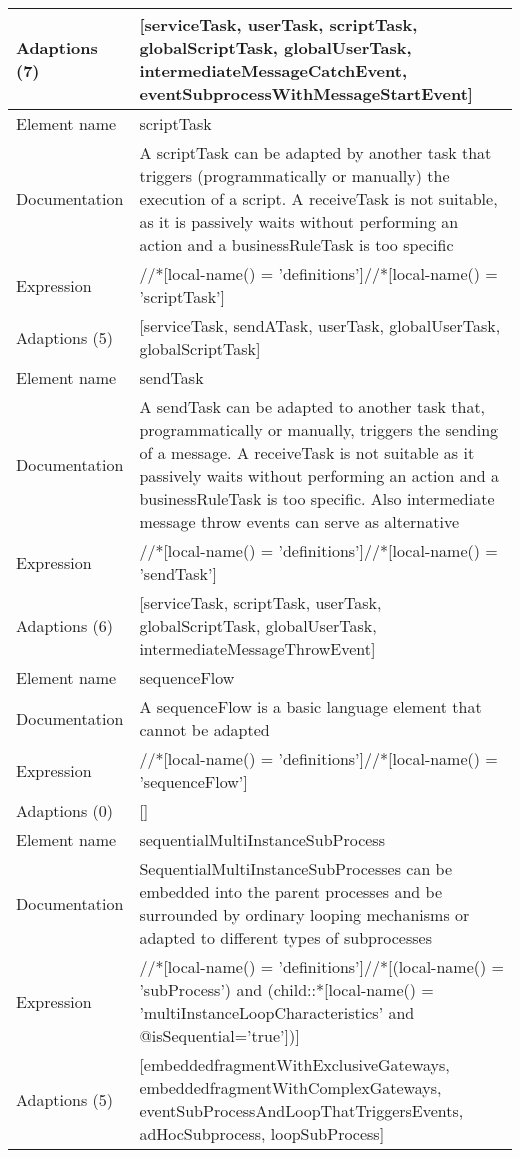 \begin{center}
\begin{tiny}
\begin{longtable}{p{}|p{}}
\myrowcolour
Adaptions (7) & [serviceTask, userTask, scriptTask, globalScriptTask, globalUserTask, intermediateMessageCatchEvent, eventSubprocessWithMessageStartEvent]\\
\midrule
Element name & scriptTask\\
\myrowcolour
Documentation &A scriptTask can be adapted by another task that triggers (programmatically  or manually) the execution of a script. A receiveTask is not suitable, as it is passively waits without performing an action and a businessRuleTask is too specific\\
Expression & //*[local-name() = 'definitions']//*[local-name() = 'scriptTask']\\
\myrowcolour
Adaptions (5) & [serviceTask, sendATask, userTask, globalUserTask, globalScriptTask]\\
\midrule
Element name & sendTask\\
\myrowcolour
Documentation &A sendTask can be adapted to another task that, programmatically or manually, triggers the sending of a message. A receiveTask is not suitable as it passively waits without performing an action and a businessRuleTask is too specific. Also intermediate message throw events can serve as alternative\\
Expression & //*[local-name() = 'definitions']//*[local-name() = 'sendTask']\\
\myrowcolour
Adaptions (6) & [serviceTask, scriptTask, userTask, globalScriptTask, globalUserTask, intermediateMessageThrowEvent]\\
\midrule
Element name & sequenceFlow\\
\myrowcolour
Documentation &A sequenceFlow is a basic language element that cannot be adapted\\
Expression & //*[local-name() = 'definitions']//*[local-name() = 'sequenceFlow']\\
\myrowcolour
Adaptions (0) & []\\
\midrule
Element name & sequentialMultiInstanceSubProcess\\
\myrowcolour
Documentation &SequentialMultiInstanceSubProcesses can be embedded into the parent processes and be surrounded by ordinary looping mechanisms or adapted to different types of subprocesses\\
Expression & //*[local-name() = 'definitions']//*[(local-name() = 'subProcess') and (child::*[local-name() = 'multiInstanceLoopCharacteristics' and @isSequential='true'])]\\
\myrowcolour
Adaptions (5) & [embeddedfragmentWithExclusiveGateways, embeddedfragmentWithComplexGateways, eventSubProcessAndLoopThatTriggersEvents, adHocSubprocess, loopSubProcess]\\

\end{longtable}
\end{tiny}
\end{center}
